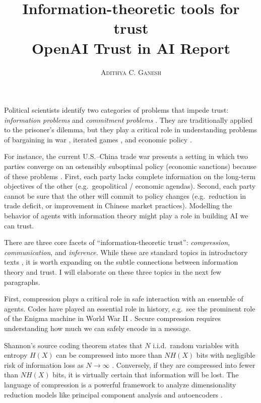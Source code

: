 \documentclass[11pt]{article}
\title{Information-theoretic tools for trust \\ \vspace{0.3cm} OpenAI Trust in AI Report}
\author{\textsc{Adithya C. Ganesh}}
\begin{document}
Political scientists identify two categories of problems that impede trust: {\it information problems} and {\it commitment problems} \cite{frieden2010world}.  They are traditionally applied to the prisoner's dilemma, but they play a critical role in understanding problems of bargaining in war \cite{lake2010two}, iterated games \cite{axelrod1981evolution}, and economic policy \cite{panagariya2003international}.

For instance, the current U.S.--China trade war presents a setting in which two parties converge on an ostensibly suboptimal policy (economic sanctions) because of these problems \cite{liu2018understanding}\cite{amiti2019impact}\cite{li2018economic}.  First, each party lacks complete information on the long-term objectives of the other (e.g.\ geopolitical / economic agendas).  Second, each party cannot be sure that the other will commit to policy changes (e.g.\ reduction in trade deficit, or improvement in Chinese market practices).  Modelling the behavior of agents with information theory might play a role in building AI we can trust. 

There are three core facets of ``information-theoretic trust'': {\it compression}, {\it communication}, and {\it inference}.  While these are standard topics in introductory texts \cite{cover2012elements}\cite{mackay2003information}, it is worth expanding on the subtle connections between information theory and trust.  I will elaborate on these three topics in the next few paragraphs.

First, compression plays a critical role in safe interaction with an ensemble of agents.  Codes have played an essential role in history, e.g.\ see the prominent role of the Enigma machine in World War II \cite{booss2003mathematics}.  Secure compression requires understanding how much we can safely encode in a message.

Shannon's source coding theorem states that $N$ i.i.d.\ random variables with entropy $H(X)$ can be compressed into more than $N H(X)$ bits with negligible risk of information loss as $N \to \infty$ \cite{shannon1948mathematical}\cite{mackay2003information}.  Conversely, if they are compressed into fewer than $N H(X)$ bits, it is virtually certain that information will be lost.  The language of compression is a powerful framework to analyze dimensionality reduction models like principal component analysis \cite{geiger2012relative} and autoencoders \cite{doersch2016tutorial}.
\end{document}
